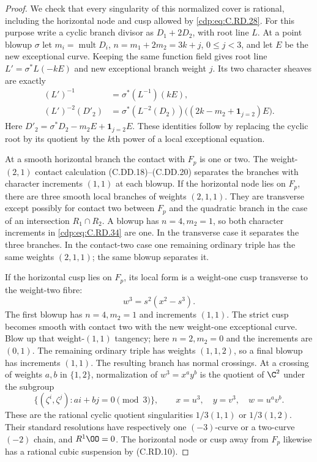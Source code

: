 \begin{proof}
We check that every singularity of this
normalized cover is rational, including the
horizontal node and cusp allowed by \eqref{cdp:eq:C.RD.28}.
For this purpose write a cyclic branch divisor
as $D_1+2D_2$, with root line $L$.
At a point blowup $\sigma$ let
$m_i=\operatorname{mult}D_i$,
$n=m_1+2m_2=3k+j$, $0\le j<3$, and let $E$
be the new exceptional curve. Keeping the
same function field gives root line
$L'=\sigma^*L(-kE)$ and new exceptional
branch weight $j$. Its two character sheaves
are exactly
\[
\begin{split}
 (L')^{-1}&=\sigma^*(L^{-1})(kE),\\
 (L')^{-2}(D'_2)
   &=\sigma^*(L^{-2}(D_2))
       \bigl((2k-m_2+\mathbf1_{j=2})E\bigr).
\end{split}
\tag{C.RD.34}\label{cdp:eq:C.RD.34}
\]
Here $D'_2=\sigma^*D_2-m_2E+\mathbf1_{j=2}E$.
These identities follow by replacing the
cyclic root by its quotient by the $k$th
power of a local exceptional equation.

At a smooth horizontal branch the contact
with $F_p$ is one or two. The weight-$(2,1)$
contact calculation (C.DD.18)--(C.DD.20)
separates the branches with character
increments $(1,1)$ at each blowup.
If the horizontal node lies on $F_p$, there
are three smooth local branches of weights
$(2,1,1)$. They are transverse except possibly
for contact two between $F_p$ and the
quadratic branch in the case of an intersection
$R_1\cap R_2$. A blowup has $n=4,m_2=1$,
so both character increments in \eqref{cdp:eq:C.RD.34}
are one. In the transverse case it separates
the three branches. In the contact-two case
one remaining ordinary triple has the same
weights $(2,1,1)$; the same blowup separates it.

If the horizontal cusp lies on $F_p$, its
local form is a weight-one cusp transverse
to the weight-two fibre:
\[
                        w^3=s^2(x^2-s^3).
\tag{C.RD.35}\label{cdp:eq:C.RD.35}
\]
The first blowup has $n=4,m_2=1$ and
increments $(1,1)$. The strict cusp becomes
smooth with contact two with the new
weight-one exceptional curve. Blow up that
weight-$(1,1)$ tangency; here $n=2,m_2=0$
and the increments are $(0,1)$.
The remaining ordinary triple has weights
$(1,1,2)$, so a final blowup has increments
$(1,1)$. The resulting branch has normal
crossings. At a crossing of weights $a,b$
in $\{1,2\}$, normalization of
$w^3=x^a y^b$ is the quotient of $\C^2$
under the subgroup
\[
 \{(\zeta^i,\zeta^j):ai+bj=0\pmod3\},
 \qquad x=u^3,\quad y=v^3,\quad w=u^av^b.
\]
These are the rational cyclic quotient
singularities $1/3(1,1)$ or $1/3(1,2)$.
Their standard resolutions have respectively
one $(-3)$-curve or a two-curve $(-2)$ chain,
and $R^1\OO=0$. The horizontal node or cusp
away from $F_p$ likewise has a rational
cubic suspension by (C.RD.10).


\end{proof}
